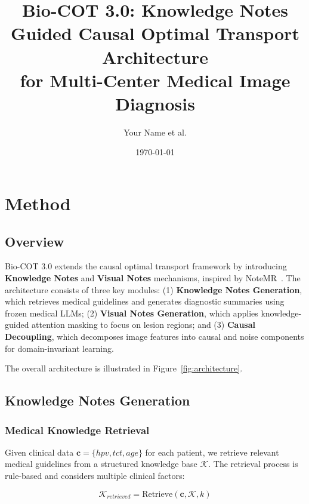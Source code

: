 \documentclass[11pt]{article}
\title{Bio-COT 3.0: Knowledge Notes Guided Causal Optimal Transport Architecture\\for Multi-Center Medical Image Diagnosis}
\author{Your Name et al.}
\date{\today}
\begin{document}
\maketitle


\section{Method}

\subsection{Overview}

Bio-COT 3.0 extends the causal optimal transport framework by introducing \textbf{Knowledge Notes} and \textbf{Visual Notes} mechanisms, inspired by NoteMR~\cite{notemr2025}. The architecture consists of three key modules: (1) \textbf{Knowledge Notes Generation}, which retrieves medical guidelines and generates diagnostic summaries using frozen medical LLMs; (2) \textbf{Visual Notes Generation}, which applies knowledge-guided attention masking to focus on lesion regions; and (3) \textbf{Causal Decoupling}, which decomposes image features into causal and noise components for domain-invariant learning.

The overall architecture is illustrated in Figure~\ref{fig:architecture}.

\subsection{Knowledge Notes Generation}

\subsubsection{Medical Knowledge Retrieval}

Given clinical data $\mathbf{c} = \{hpv, tct, age\}$ for each patient, we retrieve relevant medical guidelines from a structured knowledge base $\mathcal{K}$. The retrieval process is rule-based and considers multiple clinical factors:

\begin{equation}
\mathcal{K}_{retrieved} = \text{Retrieve}(\mathbf{c}, \mathcal{K}, k)
\end{equation}
\end{document}
